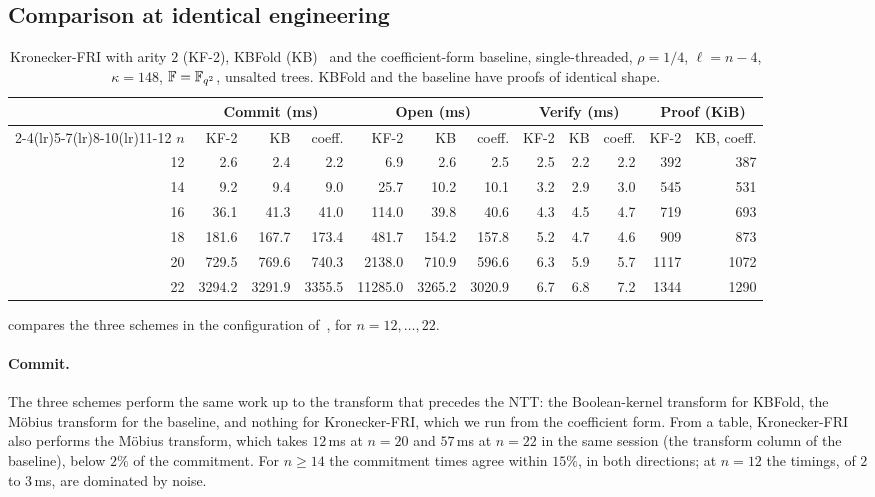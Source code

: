 \subsection{Comparison at identical engineering}\label{sec:exp:scaling}

\begin{table}[t]
\centering
\small
\setlength{\tabcolsep}{4pt}
\begin{tabular}{r rrr rrr rrr rr}
\toprule
 & \multicolumn{3}{c}{Commit (ms)} & \multicolumn{3}{c}{Open (ms)} & \multicolumn{3}{c}{Verify (ms)} & \multicolumn{2}{c}{Proof (KiB)} \\
\cmidrule(lr){2-4}\cmidrule(lr){5-7}\cmidrule(lr){8-10}\cmidrule(lr){11-12}
$n$ & KF-2 & KB & coeff. & KF-2 & KB & coeff. & KF-2 & KB & coeff. & KF-2 & KB, coeff. \\
\midrule
12 & 2.6 & 2.4 & 2.2 & 6.9 & 2.6 & 2.5 & 2.5 & 2.2 & 2.2 & 392 & 387 \\
14 & 9.2 & 9.4 & 9.0 & 25.7 & 10.2 & 10.1 & 3.2 & 2.9 & 3.0 & 545 & 531 \\
16 & 36.1 & 41.3 & 41.0 & 114.0 & 39.8 & 40.6 & 4.3 & 4.5 & 4.7 & 719 & 693 \\
18 & 181.6 & 167.7 & 173.4 & 481.7 & 154.2 & 157.8 & 5.2 & 4.7 & 4.6 & 909 & 873 \\
20 & 729.5 & 769.6 & 740.3 & 2138.0 & 710.9 & 596.6 & 6.3 & 5.9 & 5.7 & 1117 & 1072 \\
22 & 3294.2 & 3291.9 & 3355.5 & 11285.0 & 3265.2 & 3020.9 & 6.7 & 6.8 & 7.2 & 1344 & 1290 \\
\bottomrule
\end{tabular}
\caption{Kronecker-FRI with arity $2$ (KF-2), KBFold (KB)~\cite{Mkh26} and the coefficient-form baseline, single-threaded, $\rho = 1/4$, $\ell = n-4$, $\kappa = 148$, $\mathbb{F} = \mathbb{F}_{q^2}$, unsalted trees. KBFold and the baseline have proofs of identical shape.}
\label{tab:exp-scaling}
\end{table}

 compares the three schemes in the configuration of~\cite{Mkh26}, for $n = 12, \dots, 22$.

\paragraph{Commit.}
The three schemes perform the same work up to the transform that precedes the NTT: the Boolean-kernel transform for KBFold, the M\"obius transform for the baseline, and nothing for Kronecker-FRI, which we run from the coefficient form. From a table, Kronecker-FRI also performs the M\"obius transform, which takes $12$\,ms at $n = 20$ and $57$\,ms at $n = 22$ in the same session (the transform column of the baseline), below $2\%$ of the commitment. For $n \ge 14$ the commitment times agree within $15\%$, in both directions; at $n = 12$ the timings, of $2$ to $3$\,ms, are dominated by noise.

